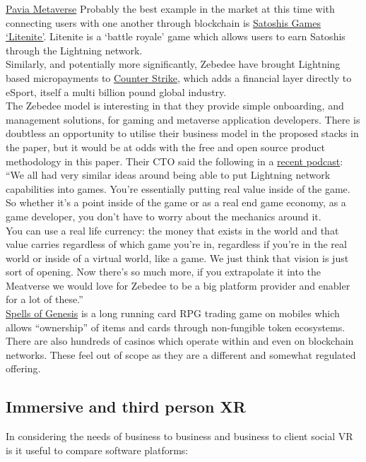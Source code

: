 \href{https://www.thesun.co.uk/tech/17348918/pavia-metaverse-cardano-crypto-game/}{Pavia Metaverse}
Probably the best example in the market at this time with connecting users with one another through blockchain is \href{https://lightnite.io/}{Satoshis Games `Litenite'}. Litenite is a `battle royale' game which allows users to earn Satoshis through the Lightning network.\\
Similarly, and potentially more significantly, Zebedee have brought Lightning based micropayments to \href{https://zebedee.io/infuse/}{Counter Strike}, which adds a financial layer directly to eSport, itself a multi billion pound global industry.\\
The Zebedee model is interesting in that they provide simple onboarding, and management solutions, for gaming and metaverse application developers. There is doubtless an opportunity to utilise their business model in the proposed stacks in the paper, but it would be at odds with the free and open source product methodology in this paper. Their CTO said the following in a \href{https://lightningjunkies.net/lightning-address-making-lightning-user-friendly-lnj052/}{recent podcast}:\\
``We all had very similar ideas around being able to put Lightning network capabilities into games. You're essentially putting real value inside of the game. So whether it's a point inside of the game or as a real end game economy, as a game developer, you don't have to worry about the mechanics around it.\\
You can use a real life currency: the money that exists in the world and that value carries regardless of which game you're in, regardless if you're in the real world or inside of a virtual world, like a game. We just think that vision is just sort of opening. Now there's so much more, if you extrapolate it into the Meatverse we would love for Zebedee to be a big platform provider and enabler for a lot of these.''\\
\href{https://spellsofgenesis.com/}{Spells of Genesis} is a long running card RPG trading game on mobiles which allows ``ownership'' of items and cards through non-fungible token ecosystems.\\
There are also hundreds of casinos which operate within and even on blockchain networks. These feel out of scope as they are a different and somewhat regulated offering.

\subsection{Immersive and third person XR}
In considering the needs of business to business and business to client social VR is it useful to compare software platforms:

